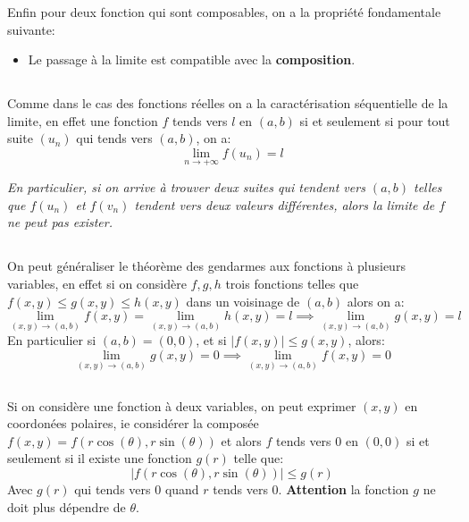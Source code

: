 Enfin pour deux fonction qui sont composables, on a la propriété fondamentale suivante:
\begin{itemize}
   \item Le passage à la limite est compatible avec la \textbf{composition}.
\end{itemize}

\subsection*{}
Comme dans le cas des fonctions réelles on a la caractérisation séquentielle de la limite, en effet une fonction \(f\) tends vers \(l\) en \((a, b)\) si et seulement si pour tout suite \((u_n)\) qui tends vers \((a, b)\), on a:
\[
   \lim_{n \rightarrow +\infty} f(u_n) = l
\]
\begin{center}
   \textit{En particulier, si on arrive à trouver deux suites qui tendent vers \((a, b)\) telles que \(f(u_n)\) et \(f(v_n)\) tendent vers deux valeurs différentes, alors la limite de \(f\) ne peut pas exister.}
\end{center}

\subsection*{}
On peut généraliser le théorème des gendarmes aux fonctions à plusieurs variables, en effet si on considère \(f, g, h\) trois fonctions telles que \(f(x, y) \leq g(x, y) \leq h(x, y)\) dans un voisinage de \((a, b)\) alors on a:
\[
   \lim_{(x, y) \rightarrow (a, b)} f(x, y) = \lim_{(x, y) \rightarrow (a, b)} h(x, y) = l \implies \lim_{(x, y) \rightarrow (a, b)} g(x, y) = l
\] 
En particulier si \((a, b) = (0, 0)\), et si \(|f(x, y)| \leq g(x, y)\), alors:
\[
   \lim_{(x, y) \rightarrow (a, b)} g(x, y) = 0 \implies \lim_{(x, y) \rightarrow (a, b)} f(x, y) = 0
\]

\subsection*{}
Si on considère une fonction à deux variables, on peut exprimer \((x, y)\) en coordonées polaires, ie considérer la composée \(f(x, y) = f(r\cos(\theta), r\sin(\theta))\) et alors \(f\) tends vers \(0\) en \((0, 0)\) si et seulement si il existe une fonction \(g(r)\) telle que:
\[
   |f(r\cos(\theta), r\sin(\theta))| \leq g(r)
\]
Avec \(g(r)\) qui tends vers \(0\) quand \(r\) tends vers \(0\). \textbf{Attention} la fonction \(g\) ne doit plus dépendre de \(\theta\).

